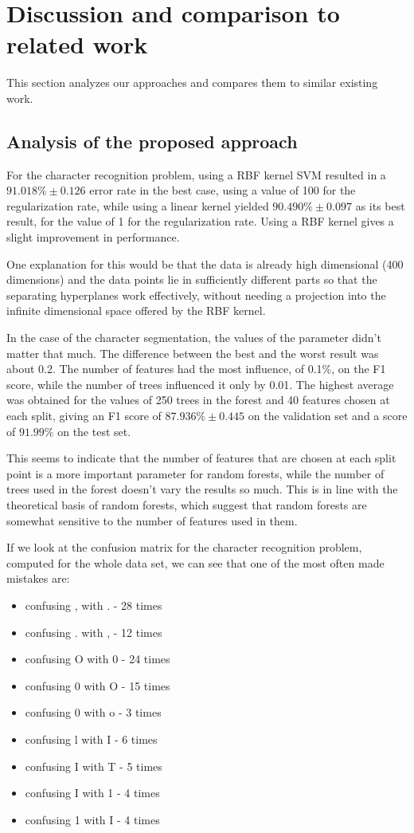 \section{Discussion and comparison to related work}
\label{sec:disc}

This section analyzes our approaches and compares them to similar existing work.

\subsection{Analysis of the proposed approach}
For the character recognition problem, using a RBF kernel SVM resulted in a $ 91.018\% \pm 0.126 $ error rate in the best case, using a value of 100 for the regularization rate, while using a linear kernel yielded $ 90.490\% \pm 0.097 $ as its best result, for the value of 1 for the regularization rate. Using a RBF kernel gives a slight improvement in performance.

One explanation for this would be that the data is already high dimensional (400 dimensions) and the data points lie in sufficiently different parts so that the separating hyperplanes work effectively, without needing a projection into the infinite dimensional space offered by the RBF kernel. 

In the case of the character segmentation, the values of the parameter didn't matter that much. The difference between the best and the worst result was about 0.2. The number of features had the most influence, of 0.1\%, on the F1 score, while the number of trees influenced it only by 0.01. The highest average was obtained for the values of 250 trees in the forest and 40 features chosen at each split, giving an F1 score of $ 87.936\% \pm 0.445$ on the validation set and a score of $ 91.99\% $ on the test set.  

This seems to indicate that the number of features that are chosen at each split point is a more important parameter for random forests, while the number of trees used in the forest doesn't vary the results so much. This is in line with the theoretical basis of random forests\cite{breiman2001random}, which suggest that random forests are somewhat sensitive to the number of features used in them. 

If we look at the confusion matrix for the character recognition problem, computed for the whole data set, we can see that one of the most often made mistakes are:
\begin{itemize}
\item confusing , with . - 28 times
\item confusing . with , - 12 times
\item confusing O with 0 - 24 times
\item confusing 0 with O - 15 times
\item confusing 0 with o - 3 times
\item confusing l with I - 6 times
\item confusing I with T - 5 times
\item confusing I with 1 - 4 times
\item confusing 1 with I - 4 times
\end{itemize} 

